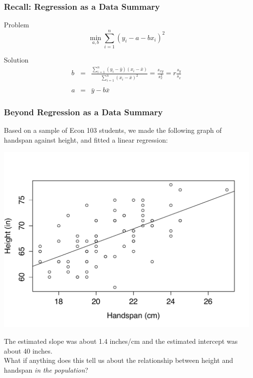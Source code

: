 \begin{frame}
\frametitle{Recall: Regression as a Data Summary}
	\begin{block}{Problem}
	$$\min_{a,b}  \sum_{i=1}^n (y_i - a - b x_i)^2$$
\end{block}
\begin{block}{Solution}
	\begin{eqnarray*}
		b &=& \frac{\sum_{i=1}^n \left(y_i - \bar{y}\right)\left(x_i - \bar{x} \right)}{\sum_{i=1}^n \left(x_i - \bar{x}\right)^2} = \frac{s_{xy}}{s_x^2} =  r\frac{s_y}{s_x}\\ \\
		a &=& \bar{y} - b\bar{x}
	\end{eqnarray*}
\end{block}
\end{frame}
\begin{frame}
\frametitle{Beyond Regression as a Data Summary}
\small
Based on a sample of Econ 103 students, we made the following graph of handspan against height, and fitted a linear regression:
\begin{center}
\includegraphics[scale = 0.3]{./images/height_handspan_reg}
\end{center}
The estimated slope was about 1.4 inches/cm and the estimated intercept was about 40 inches. \\


\alert{What if anything does this tell us about the relationship between height and handspan \emph{in the population}?}
\end{frame}
